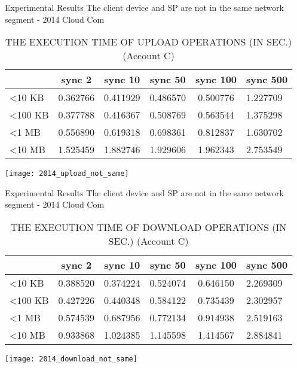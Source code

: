 \begin{frame}{Experimental Results}
{The client device and SP are \alert{not} in the same network segment - 2014 Cloud Com}
	\scriptsize
    \begin{table}[]
    \centering
    \caption{THE EXECUTION TIME OF \alert{UPLOAD} OPERATIONS (IN SEC.) (Account C)}
    \begin{tabular}{lccccl}
                         & sync 2   & sync 10  & sync 50  & sync 100 & sync 500  \\ \hline
        \textless 10 KB  & 0.362766 & 0.411929 & 0.486570 & 0.500776 & 1.227709  \\ \hline
        \textless 100 KB & 0.377788 & 0.416367 & 0.508769 & 0.563544 & 1.375298  \\ \hline
        \textless 1 MB   & 0.556890 & 0.619318 & 0.698361 & 0.812837 & 1.630702  \\ \hline
        \textless 10 MB  & 1.525459 & 1.882746 & 1.929606 & 1.962343 & 2.753549  \\ \hline
    \end{tabular}
    \end{table}
    \begin{center}
		\texttt{[image: 2014\_upload\_not\_same]}
    \end{center}
\end{frame}

\begin{frame}{Experimental Results}
{The client device and SP are \alert{not} in the same network segment - 2014 Cloud Com}
	\scriptsize
    \begin{table}[]
    \centering
    \caption{THE EXECUTION TIME OF \alert{DOWNLOAD} OPERATIONS (IN SEC.) (Account C)}
    \begin{tabular}{lccccl}
                         & sync 2   & sync 10  & sync 50  & sync 100 & sync 500  \\ \hline
        \textless 10 KB  & 0.388520 & 0.374224 & 0.524074 & 0.646150 & 2.269309  \\ \hline
        \textless 100 KB & 0.427226 & 0.440348 & 0.584122 & 0.735439 & 2.302957  \\ \hline
        \textless 1 MB   & 0.574539 & 0.687956 & 0.772134 & 0.914938 & 2.519163  \\ \hline
        \textless 10 MB  & 0.933868 & 1.024385 & 1.145598 & 1.414567 & 2.884841  \\ \hline
    \end{tabular}
    \end{table}
    \begin{center}
		\texttt{[image: 2014\_download\_not\_same]}
    \end{center}
\end{frame}


